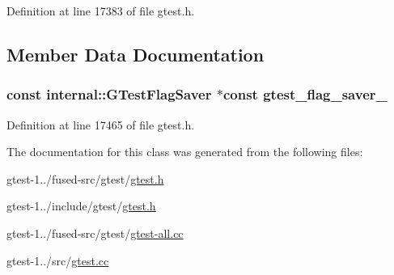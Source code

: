 \-Definition at line 17383 of file gtest.\-h.



\subsection{\-Member \-Data \-Documentation}
\hypertarget{classtesting_1_1Test_a5c5cbe8574985dae0b70d4b09b142673}{
\subsubsection[{gtest\-\_\-flag\-\_\-saver\-\_\-}]{\setlength{\rightskip}{0pt plus 5cm}const {\bf internal\-::\-G\-Test\-Flag\-Saver} $\ast$const {\bf gtest\-\_\-flag\-\_\-saver\-\_\-}}}\label{db/d9f/classtesting_1_1Test_a5c5cbe8574985dae0b70d4b09b142673}


\-Definition at line 17465 of file gtest.\-h.



\-The documentation for this class was generated from the following files\-:\begin{DoxyCompactItemize}
\item 
gtest-\/1../fused-\/src/gtest/\hyperlink{fused-src_2gtest_2gtest_8h}{gtest.\-h}\item 
gtest-\/1../include/gtest/\hyperlink{include_2gtest_2gtest_8h}{gtest.\-h}\item 
gtest-\/1../fused-\/src/gtest/\hyperlink{fused-src_2gtest_2gtest-all_8cc}{gtest-\/all.\-cc}\item 
gtest-\/1../src/\hyperlink{gtest_8cc}{gtest.\-cc}\end{DoxyCompactItemize}
